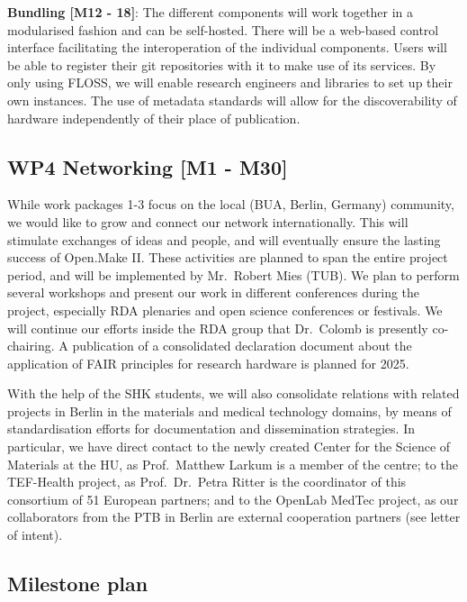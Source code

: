 \documentclass[
  12pt,
  a4paper,
]{article}
\begin{document}
\textbf{Bundling {[}M12 - 18{]}}: The different components will work
together in a modularised fashion and can be self-hosted. There will be
a web-based control interface facilitating the interoperation of the
individual components. Users will be able to register their git
repositories with it to make use of its services. By only using FLOSS,
we will enable research engineers and libraries to set up their own
instances. The use of metadata standards will allow for the
discoverability of hardware independently of their place of publication.

\hypertarget{wp4-networking-m1---m30}{%
\subsection{WP4 Networking {[}M1 -
M30{]}}\label{wp4-networking-m1---m30}}

While work packages 1-3 focus on the local (BUA, Berlin, Germany)
community, we would like to grow and connect our network
internationally. This will stimulate exchanges of ideas and people, and
will eventually ensure the lasting success of Open.Make II. These
activities are planned to span the entire project period, and will be
implemented by Mr.~Robert Mies (TUB). We plan to perform several
workshops and present our work in different conferences during the
project, especially RDA plenaries and open science conferences or
festivals. We will continue our efforts inside the RDA group that
Dr.~Colomb is presently co-chairing. A publication of a consolidated
declaration document about the application of FAIR principles for
research hardware is planned for 2025.

With the help of the SHK students, we will also consolidate relations
with related projects in Berlin in the materials and medical technology
domains, by means of standardisation efforts for documentation and
dissemination strategies. In particular, we have direct contact to the
newly created Center for the Science of Materials at the HU, as
Prof.~Matthew Larkum is a member of the centre; to the TEF-Health
project, as Prof.~Dr.~Petra Ritter is the coordinator of this consortium
of 51 European partners; and to the OpenLab MedTec project, as our
collaborators from the PTB in Berlin are external cooperation partners
(see letter of intent).

\hypertarget{milestone-plan}{%
\subsection{Milestone plan}\label{milestone-plan}}
\end{document}
